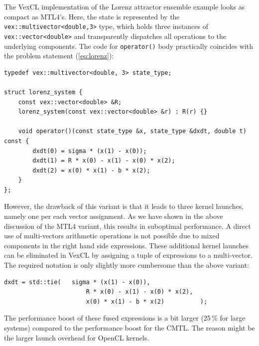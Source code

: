\documentclass[final]{siamltex}
\newcommand{\code}[1]{\lstinline$#1$}
\newcommand{\eqref}[1]{(\ref{#1})}
\begin{document}
The VexCL implementation of the Lorenz attractor ensemble example looks as
compact as MTL4's. Here, the state is represented by the
\code{vex::multivector<double,3>} type, which holds three instances of
\code{vex::vector<double>} and transparently dispatches all operations to the
underlying components. The code for \code{operator()} body practically
coincides with the problem statement \eqref{eq:lorenz}:
\begin{lstlisting}
typedef vex::multivector<double, 3> state_type;

struct lorenz_system {
    const vex::vector<double> &R;
    lorenz_system(const vex::vector<double> &r) : R(r) {}

    void operator()(const state_type &x, state_type &dxdt, double t) const {
        dxdt(0) = sigma * (x(1) - x(0));
        dxdt(1) = R * x(0) - x(1) - x(0) * x(2);
        dxdt(2) = x(0) * x(1) - b * x(2);
    }
};
\end{lstlisting}

However, the drawback of this variant is that it leads to three kernel
launches, namely one per each vector assignment. As we have shown in
the above discussion of the MTL4 variant, this results in suboptimal
performance. A direct use of multi-vectors arithmetic operations is
not possible due to mixed components in the right hand side
expressions.  These additional kernel launches can be eliminated in
VexCL by assigning a tuple of expressions to a multi-vector. The
required notation is only slightly more cumbersome than the above
variant:
\begin{lstlisting}[firstnumber=9]
    dxdt = std::tie(   sigma * (x(1) - x(0)),
                       R * x(0) - x(1) - x(0) * x(2),
                       x(0) * x(1) - b * x(2)          );
\end{lstlisting}
The performance boost of these fused expressions is a bit larger
(25\,\% for large systems) compared to the performance boost for the
CMTL. The reason might be the larger launch overhead for OpenCL
kernels.
\end{document}
